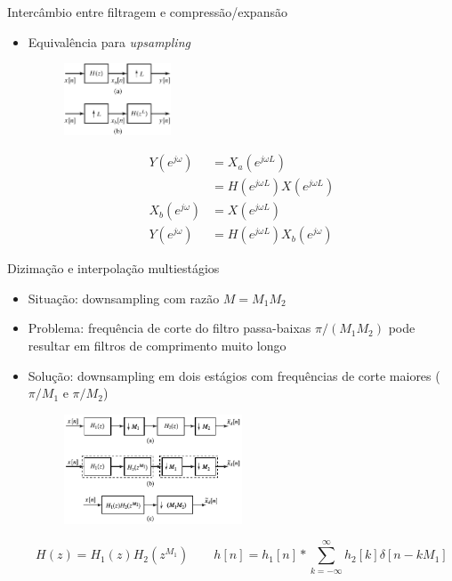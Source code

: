 \documentclass[
size=11pt,
paper=screen,
mode=present,
display=slidesnotes,
style=paintings,
nopagebreaks,
blackslide,
fleqn]{powerdot}
\begin{document}
\begin{slide}{Intercâmbio entre filtragem e compressão/expansão}
	\begin{itemize}
		\item Equivalência para \emph{upsampling}
			\begin{figure}
				\centering
				\includegraphics[width=0.3\textwidth]{figs/4-32.eps}
			\end{figure}
			\begin{align*}
				Y(e^{j\omega})&=X_a(e^{j\omega L})\\
				&=H(e^{j\omega L}) X(e^{j\omega L})\\
				X_b(e^{j\omega})&= X(e^{j\omega L})\\
				Y(e^{j\omega})&=H(e^{j\omega L})X_b(e^{j\omega })
			\end{align*}
	\end{itemize}
			
\end{slide}

\begin{slide}{Dizimação e interpolação multiestágios}
	\begin{itemize}
		\item Situação: downsampling com razão $M = M_1M_2$
		\item Problema: frequência de corte do filtro passa-baixas $\pi/(M_1M_2)$ pode resultar em filtros de comprimento muito longo
		\item Solução: downsampling em dois estágios com frequências de corte maiores ($\pi/M_1$ e $\pi/M_2$)
			\begin{figure}
				\centering
				\includegraphics[width=0.5\textwidth]{figs/4-33.eps}
			\end{figure}
			\begin{equation*}
				H(z) = H_1(z)H_2(z^{M_1})\qquad
				h[n] = h_1[n] * \sum_{k=-\infty}^\infty h_2[k]\delta[n-kM_1]
			\end{equation*}
	\end{itemize}
\end{slide}
\end{document}
